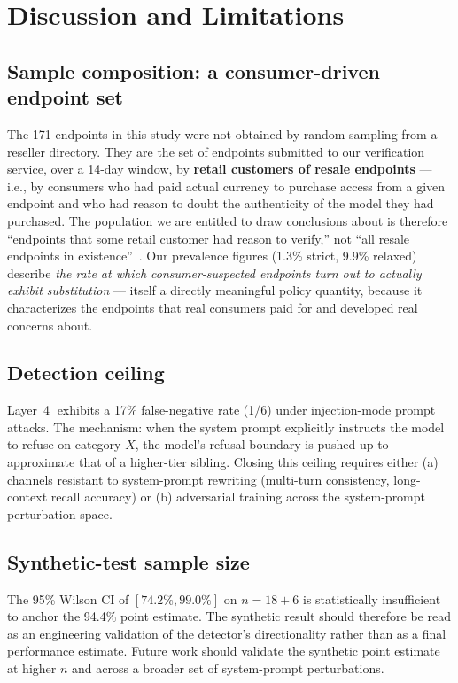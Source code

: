 \documentclass[10pt,a4paper,twocolumn]{article}
\begin{document}
\section{Discussion and Limitations}\label{sec:discussion}

\subsection{Sample composition: a consumer-driven endpoint set}\label{sec:sample}
The 171 endpoints in this study were not obtained by random sampling from a
reseller directory. They are the set of endpoints submitted to our verification
service, over a 14-day window, by \textbf{retail customers of resale endpoints}
--- i.e., by consumers who had paid actual currency to purchase access from a
given endpoint and who had reason to doubt the authenticity of the model they
had purchased. The population we are entitled to draw conclusions about is
therefore ``endpoints that some retail customer had reason to verify,'' not
``all resale endpoints in existence''~\cite{paxson2004sound}. Our prevalence
figures (1.3\% strict, 9.9\% relaxed) describe \emph{the rate at which
consumer-suspected endpoints turn out to actually exhibit substitution} ---
itself a directly meaningful policy quantity, because it characterizes the
endpoints that real consumers paid for and developed real concerns about.

\subsection{Detection ceiling}\label{sec:ceiling}
Layer~\textcircled{4} exhibits a 17\% false-negative rate (1/6) under
injection-mode prompt attacks. The mechanism: when the system prompt explicitly
instructs the model to refuse on category $X$, the model's refusal boundary is
pushed up to approximate that of a higher-tier sibling. Closing this ceiling
requires either (a) channels resistant to system-prompt rewriting (multi-turn
consistency, long-context recall accuracy) or (b) adversarial training across
the system-prompt perturbation space.

\subsection{Synthetic-test sample size}
The 95\% Wilson CI of $[74.2\%, 99.0\%]$ on $n{=}18+6$ is statistically
insufficient to anchor the 94.4\% point estimate. The synthetic result should
therefore be read as an engineering validation of
the detector's directionality rather than as a final performance estimate.
Future work should validate the synthetic point estimate at higher $n$ and
across a broader set of system-prompt perturbations.
\end{document}
